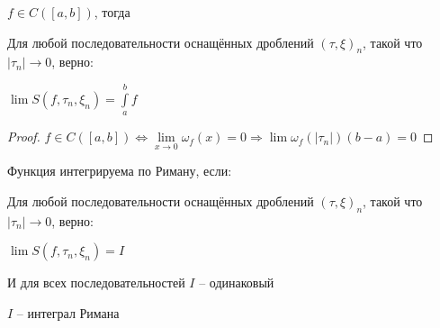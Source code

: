 \begin{theorem}
\begin{consequence}
    	$f \in C([a,b])$, тогда

    	Для любой последовательности оснащённых дроблений $(\tau,\xi)_n$, такой что $|\tau_n| \rightarrow 0$, верно:

    	$\lim S(f,\tau_n,\xi_n) = \int\limits_a^b f$

		\begin{proof} \thmslashn

    		$f \in C([a,b]) \Leftrightarrow \lim\limits_{x \rightarrow 0} \omega_f(x) = 0 \Rightarrow \lim \omega_f(|\tau_n|)(b-a) = 0$

    	\end{proof}

    \end{consequence}

\end{theorem}

\begin{definition} \thmslashn 

	Функция интегрируема по Риману, если: 

	Для любой последовательности оснащённых дроблений $(\tau,\xi)_n$, такой что $|\tau_n| \rightarrow 0$, верно:

    $\lim S(f,\tau_n,\xi_n) = I$

    И для всех последовательностей $I$ -- одинаковый

    $I$ -- интеграл Римана


\end{definition}
